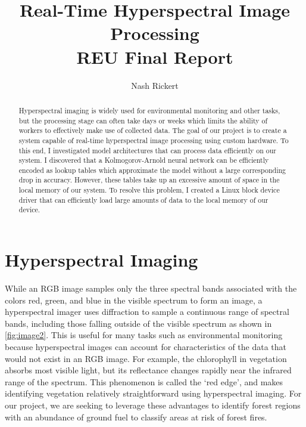 \documentclass[psamsfonts]{amsart}
\title{Real-Time Hyperspectral Image Processing \\REU Final Report}
\author{Nash Rickert}
\theoremstyle{definition}
\theoremstyle{remark}
\numberwithin{equation}{section}
\begin{document}
\begin{abstract}

    Hyperspectral imaging is widely used for environmental monitoring and other tasks, but the processing stage can often take days or weeks which limits the ability of workers to effectively make use of collected data. The goal of our project is to create a system capable of real-time hyperspectral image processing using custom hardware. To this end, I investigated model architectures that can process data efficiently on our system. I discovered that a Kolmogorov-Arnold neural network can be efficiently encoded as lookup tables which approximate the model without a large corresponding drop in accuracy. However, these tables take up an excessive amount of space in the local memory of our system. To resolve this problem, I created a Linux block device driver that can efficiently load large amounts of data to the local memory of our device.


\end{abstract}

\maketitle

\vspace{-1em}

\tableofcontents

\section{Hyperspectral Imaging}
While an RGB image samples only the three spectral bands associated with the colors red, green, and blue in the visible spectrum to form an image, a hyperspectral imager uses diffraction to sample a continuous range of spectral bands, including those falling outside of the visible spectrum as shown in \autoref{fig:image2}. This is useful for many tasks such as environmental monitoring because hyperspectral images can account for characteristics of the data that would not exist in an RGB image. For example, the chlorophyll in vegetation absorbs most visible light, but its reflectance changes rapidly near the infrared range of the spectrum. This phenomenon is called the `red edge', and makes identifying vegetation relatively straightforward using hyperspectral imaging. For our project, we are seeking to leverage these advantages to identify forest regions with an abundance of ground fuel to classify areas at risk of forest fires.
\end{document}
